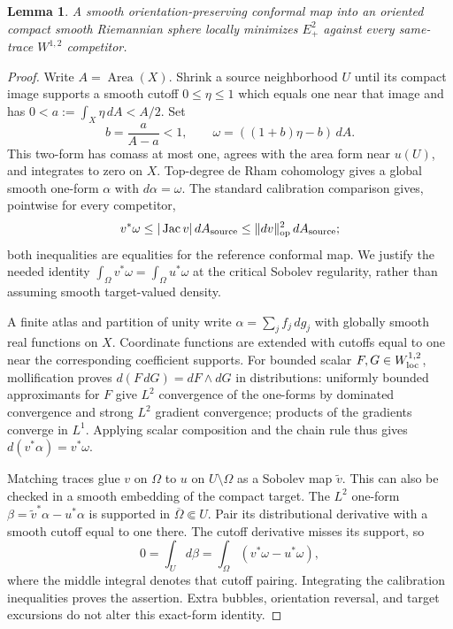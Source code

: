 \documentclass[11pt]{article}
\newtheorem{lemma}[theorem]{Lemma}
\newcommand{\Ep}{E_+^2}
\newcommand{\op}{\operatorname{op}}
\begin{document}
\begin{lemma}\label{lem:cap}
A smooth orientation-preserving conformal map into an oriented compact smooth
Riemannian sphere locally minimizes $\Ep$ against every same-trace
$W^{1,2}$ competitor.
\end{lemma}
\begin{proof}
Write $A=\operatorname{Area}(X)$. Shrink a source neighborhood $U$ until its
compact image supports a smooth cutoff $0\le\eta\le1$ which equals one near
that image and has $0<a:=\int_X\eta\,dA<A/2$. Set
\[
 b=\frac a{A-a}<1,\qquad \omega=((1+b)\eta-b)\,dA.
\]
This two-form has comass at most one, agrees with the area form near $u(U)$,
and integrates to zero on $X$. Top-degree de Rham cohomology gives a global
smooth one-form $\alpha$ with $d\alpha=\omega$.
The standard calibration comparison \cite{hl} gives, pointwise for every
competitor,
\[
 v^*\omega\le |\operatorname{Jac}v|\,dA_{\rm source}
 \le\|dv\|_{\op}^2\,dA_{\rm source};
\]
both inequalities are equalities for the reference conformal map. We justify
the needed identity $\int_\Omega v^*\omega=\int_\Omega u^*\omega$ at the
critical Sobolev regularity, rather than assuming smooth target-valued density.

A finite atlas and partition of unity write $\alpha=\sum_j f_j\,dg_j$ with
globally smooth real functions on $X$. Coordinate functions are extended with
cutoffs equal to one near the corresponding coefficient supports. For bounded
scalar $F,G\in W^{1,2}_{\rm loc}$, mollification proves
$d(F\,dG)=dF\wedge dG$ in distributions: uniformly bounded approximants for
$F$ give $L^2$ convergence of the one-forms by dominated convergence and
strong $L^2$ gradient convergence; products of the gradients converge in $L^1$.
Applying scalar composition and the chain rule thus gives
$d(v^*\alpha)=v^*\omega$.

Matching traces glue $v$ on $\Omega$ to $u$ on $U\setminus\Omega$ as a
Sobolev map $\widetilde v$. This can also be checked in a smooth embedding of
the compact target. The $L^2$ one-form
$\beta=\widetilde v^*\alpha-u^*\alpha$ is supported in
$\overline\Omega\Subset U$. Pair its distributional derivative with a smooth
cutoff equal to one there. The cutoff derivative misses its support, so
\[
 0=\int_U d\beta=\int_\Omega(v^*\omega-u^*\omega),
\]
where the middle integral denotes that cutoff pairing. Integrating the
calibration inequalities proves the assertion. Extra bubbles, orientation
reversal, and target excursions do not alter this exact-form identity.
\end{proof}
\end{document}
